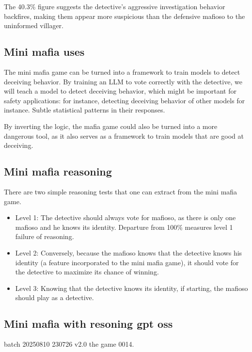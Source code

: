 \documentclass{article}
\begin{document}
  The 40.3\% figure suggests the detective's aggressive investigation behavior backfires, making them appear more suspicious than the defensive mafioso to the uninformed villager.





\subsection{Mini mafia uses}

The mini mafia game can be turned into a framework to train models to detect deceiving behavior. By training an LLM to vote correctly with the detective, we will teach a model to detect deceiving behavior, which might be important for safety applications: for instance, detecting deceiving behavior of other models for instance. Subtle statistical patterns in their responses.

By inverting the logic, the mafia game could also be turned into a more dangerous tool, as it also serves as a framework to train models that are good at deceiving.



\subsection{Mini mafia reasoning}

There are two simple reasoning tests that one can extract from the mini mafia game. 
\begin{itemize}
    \item Level 1: The detective should always vote for mafioso, as there is only one mafioso and he knows its identity. Departure from 100\% measures level 1 failure of reasoning.
    \item Level 2: Conversely, because the mafioso knows that the detective knows his identity (a feature incorporated to the mini mafia game), it should vote for the detective to maximize its chance of winning.
    \item Level 3: Knowing that the detective knows its identity, if starting, the mafioso should play as a detective.
\end{itemize}


\subsection{Mini mafia with resoning gpt oss}

batch 20250810 230726 v2.0 the game 0014.
\end{document}
